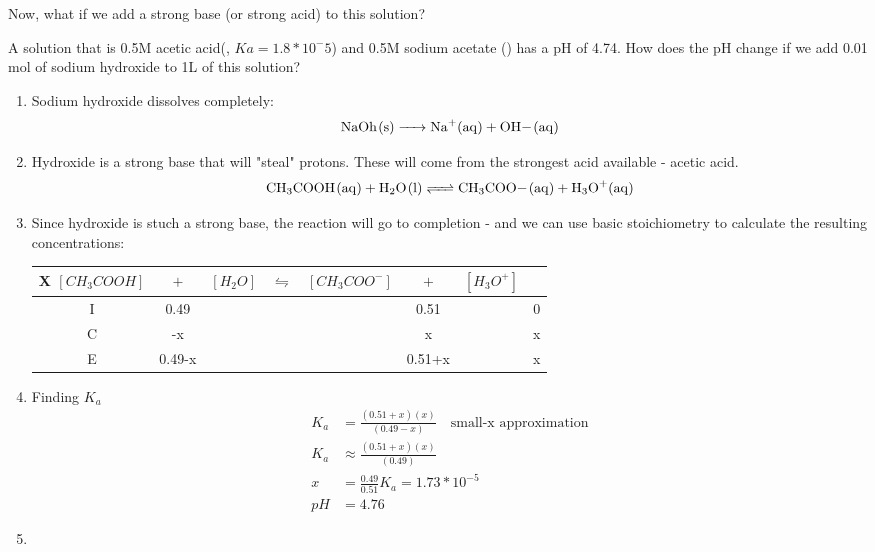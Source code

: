 \documentclass[../CHEM152Notes.tex]{subfiles}
\begin{document}
Now, what if we add a strong base (or strong acid) to this solution?
\begin{exmp}
    A solution that is 0.5M acetic acid(, $Ka = 1.8*10^-5$) and 0.5M sodium acetate () has a pH of 4.74. How does the pH change if we add 0.01 mol of sodium hydroxide to 1L of this solution?
\end{exmp}
\begin{enumerate}
    \item Sodium hydroxide dissolves completely:
    \begin{equation*}
        \begin{aligned}
            \ce{NaOh_(s) -> Na+_(aq) + OH-_(aq)}
        \end{aligned}
    \end{equation*}
    
    \item Hydroxide is a strong base that will "steal" protons. These will come from the strongest acid available - acetic acid.
    \begin{equation*}
        \begin{aligned}
            \ce{CH3COOH_(aq) + H2O_(l) <=> CH3COO-_(aq) + H3O+_(aq)}
        \end{aligned}
    \end{equation*}
    \item Since hydroxide is stuch a strong base, the reaction will go to completion - and we can use basic stoichiometry to calculate the resulting concentrations:
    \begin{tabular}{c|c@{}c@{}c@{}c@{}c@{}c@{}c}
        \hline
        X   $[CH_3COOH]$ & ${}+{}$ & $[H_2O]$ & ${}\leftrightharpoons{}$ & $[CH_3COO^-]$ & ${}+{}$ & $[H_3O^+]$ \\
        \hline
        I   &  0.49     &&     &&  0.51   && 0  \\
        C   &  -x       &&     &&  x   && x  \\
        E   &  0.49-x   &&     &&  0.51+x   &&  x \\      
    \end{tabular}
    \item Finding $K_a$
    \begin{equation*}
        \begin{aligned}
            K_a &= \frac{(0.51+x)(x)}{(0.49-x)} \quad \text{small-x approximation} \\
            K_a &\approx \frac{(0.51+x)(x)}{(0.49)} \\
            x &= \frac{0.49}{0.51}K_a = 1.73*10^{-5} \\
            pH &= 4.76
        \end{aligned}
    \end{equation*}
    \item 
\end{enumerate}
\end{document}
